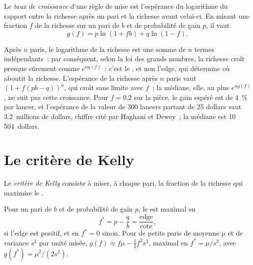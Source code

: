 \begin{definition}\label{def:m2:thinking-in-expected-value:growth}
Le \emph{taux de croissance} d'une règle de mise est l'espérance du logarithme
du rapport entre la richesse après un pari et la richesse avant celui-ci. En misant une fraction $f$ de la richesse sur
un pari de  $b$ et de probabilité de gain $p$, il vaut
\[
g(f) = p\ln(1 + fb) + q\ln(1 - f).
\]
\end{definition}

Après $n$ paris, le logarithme de la richesse est une somme de $n$ termes indépendants~; par conséquent, selon la loi
des grands nombres, la richesse croît presque sûrement comme $e^{n g(f)}$~: c'est le , et non l'edge,
qui détermine où aboutit la richesse. L'espérance de la richesse après $n$ paris vaut $(1 + f(pb -
q))^n$, qui croît sans limite avec $f$~; la médiane, elle, au plus $e^{n g(f)}$, ne suit pas cette croissance. Pour
$f = 0.2$ sur la pièce, le gain espéré est de 4~\% par lancer, et l'espérance de la valeur de 300 lancers
partant de 25 dollars vaut 3.2~millions de dollars, chiffre cité par Haghani et Dewey~; la médiane est
10\,504~dollars.

\section{Le critère de Kelly}

\begin{definition}\label{def:m2:thinking-in-expected-value:kelly}
Le \emph{critère de Kelly} consiste à miser, à chaque pari, la fraction de
la richesse qui maximise le .
\end{definition}

\begin{proposition}\label{prop:m2:thinking-in-expected-value:kelly}
Pour un pari de  $b$ et de probabilité de gain $p$, le  est maximal en
\[
f^* = p - \frac{q}{b} = \frac{\text{edge}}{\text{cote}},
\]
si l'edge est positif, et en $f^* = 0$ sinon. Pour de petits paris de moyenne $\mu$ et
de variance $s^2$ par unité misée, $g(f) \approx f\mu - \tfrac12 f^2 s^2$, maximal en $f^* =
\mu / s^2$, avec $g(f^*) = \mu^2 / (2s^2)$.
\end{proposition}

